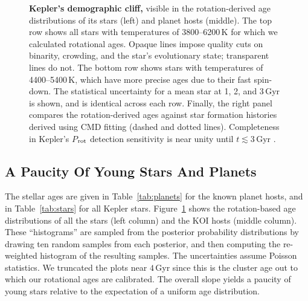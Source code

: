 \documentclass[11pt,twocolumn,tighten,linenumbers]{aastex63}
\begin{document}
\begin{figure}[!t]
  \begin{center}
    \leavevmode

	\vspace{-0.35cm}
  \end{center}
  \vspace{-0.66cm}
  \caption{{\bf Kepler's demographic cliff,} visible in the
  rotation-derived age distributions of its stars (left) and planet
  hosts (middle).  The top row shows all stars with temperatures of
  3800--6200\,K for which we calculated rotational ages.  Opaque lines
  impose quality cuts on binarity, crowding, and the star's
  evolutionary state; transparent lines do not.  The bottom row shows
  stars with temperatures of 4400--5400\,K, which have more precise
  ages due to their fast spin-down.  The statistical uncertainty for a
  mean star at 1, 2, and 3\,Gyr is shown, and is identical across each
  row.  Finally, the right panel compares the rotation-derived ages
  against star formation histories derived using CMD fitting (dashed
  and dotted lines).  Completeness in Kepler's $P$$_{\rm rot}$
  detection sensitivity is near unity until $t$$\lesssim$3\,Gyr
  \citep{2022ApJ...937...94M}.
  \label{fig:hist_tgyro}
  }
\end{figure}


\subsection{A Paucity Of Young Stars And Planets}

The stellar ages are given in Table~\ref{tab:planets} for the known
planet hosts, and in Table~\ref{tab:stars} for all Kepler stars.
Figure~\ref{fig:hist_tgyro} shows the rotation-based age distributions
of all the stars (left column) and the KOI hosts (middle column).
These ``histograms'' are sampled from the posterior probability
distributions by drawing ten random samples from each posterior, and
then computing the re-weighted histogram of the resulting samples.
The uncertainties assume Poisson statistics.  We truncated the plots
near $4$\,Gyr since this is the cluster age out to which our
rotational ages are calibrated.  The overall slope yields a paucity of
young stars relative to the expectation of a uniform age distribution.
\end{document}
